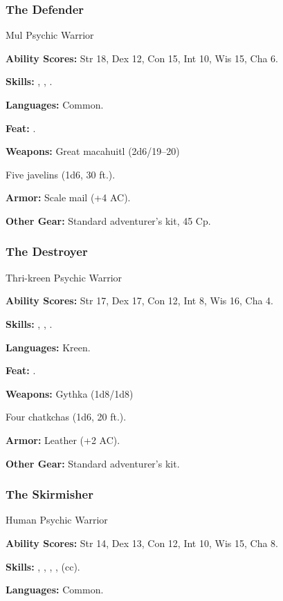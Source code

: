 \subsubsection{The Defender}

Mul Psychic Warrior

\textbf{Ability Scores:} Str 18, Dex 12, Con 15, Int 10, Wis 15, Cha 6.

\textbf{Skills:} , , .

\textbf{Languages:} Common.

\textbf{Feat:} .

\textbf{Weapons:} Great macahuitl (2d6/19–20)

Five javelins (1d6, 30 ft.).

\textbf{Armor:} Scale mail (+4 AC).

\textbf{Other Gear:} Standard adventurer's kit, 45 Cp.

\subsubsection{The Destroyer}

Thri-kreen Psychic Warrior

\textbf{Ability Scores:} Str 17, Dex 17, Con 12, Int 8, Wis 16, Cha 4.

\textbf{Skills:} , , .

\textbf{Languages:} Kreen.

\textbf{Feat:} .

\textbf{Weapons:} Gythka (1d8/1d8)

Four chatkchas (1d6, 20 ft.).

\textbf{Armor:} Leather (+2 AC).

\textbf{Other Gear:} Standard adventurer's kit.

\subsubsection{The Skirmisher}

Human Psychic Warrior

\textbf{Ability Scores:} Str 14, Dex 13, Con 12, Int 10, Wis 15, Cha 8.

\textbf{Skills:} , , , ,  (cc).

\textbf{Languages:} Common.

